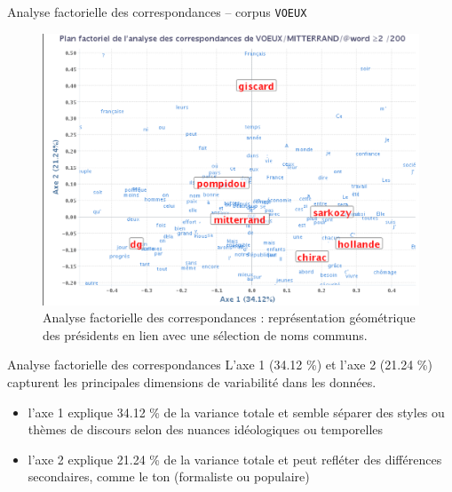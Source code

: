\documentclass[xetex,xcolor={table,usenames,dvipsnames}]{beamer}
\begin{document}
\begin{frame}{Analyse factorielle des correspondances -- corpus \texttt{VOEUX}}
		\begin{figure}[h] %
		\centering
		\includegraphics[width=.8\linewidth]{img/afc.png}
		\caption{Analyse factorielle des correspondances : représentation géométrique des présidents en lien avec une sélection de noms communs.}
		\label{fig:ling_out_TAL}
	\end{figure}
\end{frame}

\begin{frame}{Analyse factorielle des correspondances}
	L'axe 1 (\textsc{34.12} \%) et l'axe 2 (\textsc{21.24} \%) capturent les principales dimensions de variabilité dans les données. 
	\begin{itemize}
		\item l'axe 1 explique 34.12 \% de la variance totale et semble séparer des styles ou thèmes de discours selon des nuances idéologiques ou temporelles
		\item l'axe 2 explique 21.24 \% de la variance totale et peut refléter des différences secondaires, comme le ton (formaliste ou populaire)
	\end{itemize}
	
\end{frame}
\end{document}
